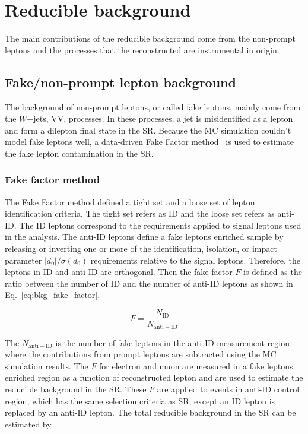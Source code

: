 
\section{Reducible background}
\label{sec:bkg_reducible_background}
The main contributions of the reducible background come from the non-prompt leptons and the processes that the reconstructed \met are instrumental in origin.


\subsection{Fake/non-prompt lepton background}
\label{subsec:bkg_fake_lepton_background}
The background of non-prompt leptons, or called fake leptons, mainly come from the $W$+jets, VV, \ttbar processes.
In these processes, a jet is misidentified as a lepton and form a dilepton final state in the SR.
Because the MC simulation couldn't model fake leptons well, a data-driven Fake Factor method~\cite{ATLAS:2014aga} is used to estimate the fake lepton contamination in the SR. 


\subsubsection{Fake factor method}
\label{subsubsec:bkg_fake_factor_method}
The Fake Factor method defined a tight set and a loose set of lepton identification criteria.
The tight set refers as ID and the loose set refers as anti-ID.
The ID leptons correspond to the requirements applied to signal leptons used in the analysis.
The anti-ID leptons define a fake leptons enriched sample by releasing or inverting one or more of the identification, isolation, or impact parameter $|d_{0}|/\sigma(d_{0})$ requirements relative to the signal leptons.
Therefore, the leptons in ID and anti-ID are orthogonal.
Then the fake factor $F$ is defined as the ratio between the number of ID and the number of anti-ID leptons as shown in Eq.~\ref{eq:bkg_fake_factor}.

\begin{equation}
    F = \frac{N_\mathrm{ID}}{N_\mathrm{anti-ID}}
    \label{eq:bkg_fake_factor}
\end{equation}

The $N_\mathrm{anti-ID}$ is the number of fake leptons in the anti-ID measurement region where the contributions from prompt leptons are subtracted using the MC simulation results.
The $F$ for electron and muon are measured in a fake leptons enriched region as a function of reconstructed lepton \pt and are used to estimate the reducible background in the SR.
These $F$ are applied to events in anti-ID control region, which has the same selection criteria as SR, except an ID lepton is replaced by an anti-ID lepton.
The total reducible background in the SR can be estimated by

